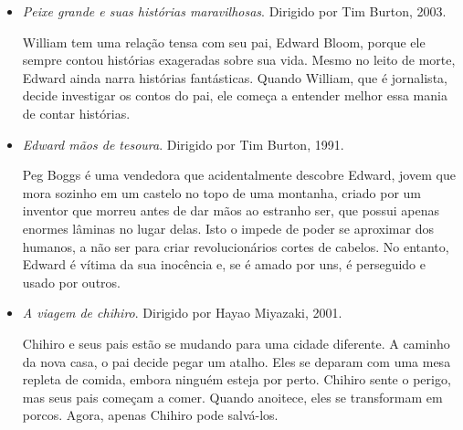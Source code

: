 \documentclass[11pt]{extarticle}
\begin{document}
\begin{itemize}
\item \textit{Peixe grande e suas histórias maravilhosas}. Dirigido por Tim Burton, 2003.

William tem uma relação tensa com seu pai, Edward Bloom, porque ele sempre contou histórias exageradas sobre sua vida. Mesmo no leito de morte, Edward ainda narra histórias fantásticas. Quando William, que é jornalista, decide investigar os contos do pai, ele começa a entender melhor essa mania de contar histórias.

\item \textit{Edward mãos de tesoura}. Dirigido por Tim Burton, 1991.

Peg Boggs é uma vendedora que acidentalmente descobre Edward, jovem que mora sozinho em um castelo no topo de uma montanha, criado por um inventor que morreu antes de dar mãos ao estranho ser, que possui apenas enormes lâminas no lugar delas. Isto o impede de poder se aproximar dos humanos, a não ser para criar revolucionários cortes de cabelos. No entanto, Edward é vítima da sua inocência e, se é amado por uns, é perseguido e usado por outros.

\item \textit{A viagem de chihiro}. Dirigido por Hayao Miyazaki, 2001.

Chihiro e seus pais estão se mudando para uma cidade diferente. A caminho da nova casa, o pai decide pegar um atalho. Eles se deparam com uma mesa repleta de comida, embora ninguém esteja por perto. Chihiro sente o perigo, mas seus pais começam a comer. Quando anoitece, eles se transformam em porcos. Agora, apenas Chihiro pode salvá-los.

\end{itemize}
\end{document}
